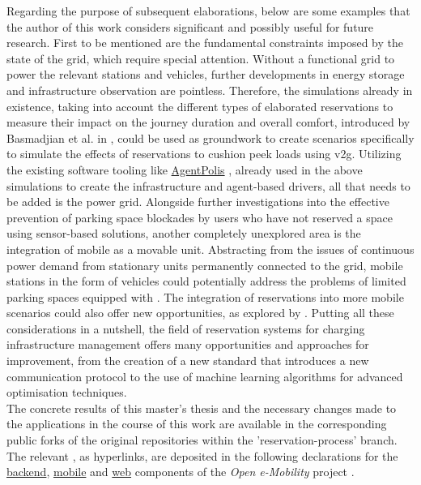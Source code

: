 \noindent Regarding the purpose of subsequent elaborations, below are some examples that the author of this work considers significant and possibly useful for future research. 
First to be mentioned are the fundamental constraints imposed by the state of the grid, which require special attention. Without a functional grid to power the relevant stations and vehicles, further developments in energy storage and infrastructure observation are pointless.
Therefore, the simulations already in existence, taking into account the different types of elaborated reservations to measure their impact on the journey duration and overall comfort, introduced by Basmadjian et al. in \cite{basmadjian_reference_2020,basmadjian_interoperable_2019}, could be used as groundwork to create scenarios specifically to simulate the effects of reservations to cushion peek loads using \acrshort{v2g}.
Utilizing the existing software tooling like \href{https://github.com/aicenter/agentpolis}{AgentPolis} \cite{noauthor_agentpolis_2022}, already used in the above simulations to create the infrastructure and agent-based drivers, all that needs to be added is the power grid.
Alongside further investigations into the effective prevention of parking space blockades by users who have not reserved a space using sensor-based solutions, another completely unexplored area is the integration of mobile  as a movable unit.
Abstracting from the issues of continuous power demand from stationary units permanently connected to the grid, mobile stations in the form of vehicles could potentially address the problems of limited parking spaces equipped with . The integration of reservations into more mobile scenarios could also offer new opportunities, as explored by \cite{zhang_mobile_2020}.
Putting all these considerations in a nutshell, the field of reservation systems for charging infrastructure management offers many opportunities and approaches for improvement, from the creation of a new standard that introduces a new communication protocol to the use of machine learning algorithms for advanced optimisation techniques. \\
The concrete results of this master's thesis and the necessary changes made to the applications in the course of this work are available in the corresponding public forks of the original repositories within the 'reservation-process' branch. The relevant , as hyperlinks, are deposited in the following declarations for the \href{https://github.com/JulianHBuecher/ev-server/tree/reservation-process}{backend}, \href{https://github.com/JulianHBuecher/ev-mobile/tree/reservation-process}{mobile} and \href{https://github.com/JulianHBuecher/ev-dashboard/tree/reservation-process}{web} components of the \textit{Open e-Mobility} project \cite{noauthor_github_nodate,noauthor_github_nodate-1,noauthor_github_nodate-2}. 
